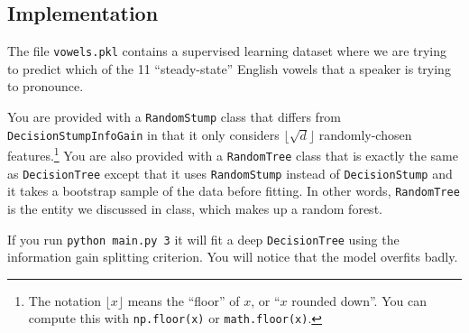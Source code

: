 \documentclass{article}
\begin{document}
 \subsection{Implementation}

The file \texttt{vowels.pkl} contains a supervised learning dataset where we are trying to predict which of the 11 ``steady-state'' English vowels that a speaker is trying to pronounce.

You are provided with a \texttt{RandomStump} class that differs from
\texttt{DecisionStumpInfoGain} in that
it only considers $\lfloor \sqrt{d} \rfloor$ randomly-chosen features.\footnote{The notation $\lfloor x\rfloor$ means the ``floor'' of $x$, or ``$x$ rounded down''. You can compute this with \texttt{np.floor(x)} or \texttt{math.floor(x)}.}
You are also provided with a \texttt{RandomTree} class that is exactly the same as
\texttt{DecisionTree} except that it uses \texttt{RandomStump} instead of
\texttt{DecisionStump} and it takes a bootstrap sample of the data before fitting.
In other words, \texttt{RandomTree} is the entity we discussed in class, which
makes up a random forest.

If you run \texttt{python main.py 3} it will fit a deep \texttt{DecisionTree}
using the information gain splitting criterion. You will notice that the model overfits badly.
\end{document}
